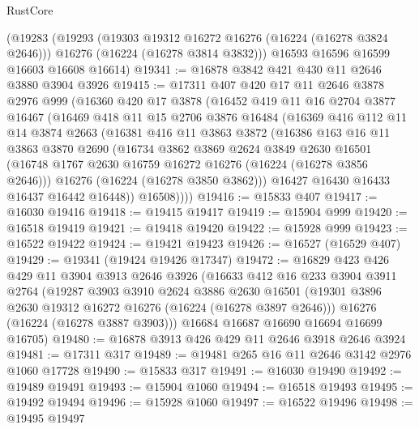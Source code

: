 \begin{lexlean}{RustCore}
\begin{coremodule}
    (@19283
      (@19293
        (@19303 @19312 @16272 @16276 (@16224 (@16278 @3824 @2646)))
        @16276
        (@16224 (@16278 @3814 @3832)))
      @16593
      @16596
      @16599
      @16603
      @16608
      @16614)
@19341 := @16878 @3842 @421 @430 @11 @2646 @3880 @3904 @3926
@19415 := @17311
    @407
    @420
    @17
    @11
    @2646
    @3878
    @2976
    @999
    (@16360
      @420
      @17
      @3878
      (@16452
        @419
        @11
        @16
        @2704
        @3877
        @16467
        (@16469
          @418
          @11
          @15
          @2706
          @3876
          @16484
          (@16369
            @416
            @112
            @11
            @14
            @3874
            @2663
            (@16381
              @416
              @11
              @3863
              @3872
              (@16386
                @163
                @16
                @11
                @3863
                @3870
                @2690
                (@16734
                  @3862
                  @3869
                  @2624
                  @3849
                  @2630
                  @16501
                  (@16748 @1767 @2630 @16759 @16272 @16276 (@16224 (@16278 @3856 @2646)))
                  @16276
                  (@16224 (@16278 @3850 @3862)))
                @16427
                @16430
                @16433
                @16437
                @16442
                @16448))
            @16508))))
@19416 := @15833 @407
@19417 := @16030 @19416
@19418 := @19415 @19417
@19419 := @15904 @999
@19420 := @16518 @19419
@19421 := @19418 @19420
@19422 := @15928 @999
@19423 := @16522 @19422
@19424 := @19421 @19423
@19426 := @16527 (@16529 @407)
@19429 := @19341 (@19424 @19426 @17347)
@19472 := @16829
    @423
    @426
    @429
    @11
    @3904
    @3913
    @2646
    @3926
    (@16633
      @412
      @16
      @233
      @3904
      @3911
      @2764
      (@19287
        @3903
        @3910
        @2624
        @3886
        @2630
        @16501
        (@19301 @3896 @2630 @19312 @16272 @16276 (@16224 (@16278 @3897 @2646)))
        @16276
        (@16224 (@16278 @3887 @3903)))
      @16684
      @16687
      @16690
      @16694
      @16699
      @16705)
@19480 := @16878 @3913 @426 @429 @11 @2646 @3918 @2646 @3924
@19481 := @17311 @317
@19489 := @19481 @265 @16 @11 @2646 @3142 @2976 @1060 @17728
@19490 := @15833 @317
@19491 := @16030 @19490
@19492 := @19489 @19491
@19493 := @15904 @1060
@19494 := @16518 @19493
@19495 := @19492 @19494
@19496 := @15928 @1060
@19497 := @16522 @19496
@19498 := @19495 @19497

\end{coremodule}
\end{lexlean}
